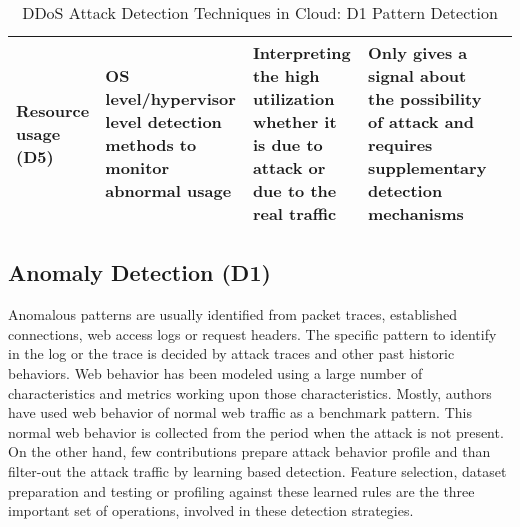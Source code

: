 \documentclass[final,5p,times,twocolumn]{elsarticle}
\begin{document}
\begin{table*}[htb]
\begin{center}
{\begin{tabular}{|l|l|l|l|l|}
\parbox{2cm}{Resource usage (D5)}  		& \parbox{3.5cm}{ OS level/hypervisor level detection methods to monitor abnormal usage}  & \parbox{3.5cm}{Interpreting the high utilization whether it is due to attack or due to the real traffic}  &  \parbox{4cm}{Only gives a signal  about  the possibility of attack and requires supplementary detection mechanisms } &  \parbox{2cm} {\cite{DARAC}\cite{defend}\cite{latanicki}  \cite{canwebeat}}\\\hline

\end{tabular}
}\end{center}
\caption{{DDoS Attack Detection Techniques in Cloud: D1 Pattern Detection}}
\label{D1}
\end{table*}

\subsection{Anomaly Detection (D1)}
\label{pattern}
{Anomalous patterns are usually identified from packet traces, established connections, web access logs or request headers. The specific pattern to identify in the log or the trace is decided by attack traces and other past historic behaviors. Web behavior has been modeled using a large number of characteristics and metrics working upon those characteristics. Mostly, authors have used web behavior of normal web traffic as a benchmark pattern. This normal web behavior is collected from the period when the attack is not present. On the other hand, few contributions prepare attack behavior profile and than filter-out the attack traffic by learning based detection. Feature selection, dataset preparation and testing or profiling against these learned rules are the three important set of operations, involved in these detection strategies. }
\end{document}
